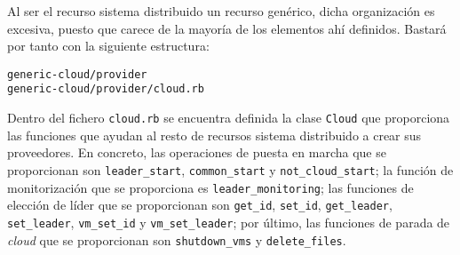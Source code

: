 Al ser el recurso sistema distribuido un recurso genérico, dicha organización es excesiva, puesto que carece de la mayoría de los elementos ahí definidos. Bastará por tanto con la siguiente estructura:

\begin{lstlisting}
generic-cloud/provider
generic-cloud/provider/cloud.rb
\end{lstlisting}

Dentro del fichero \texttt{cloud.rb} se encuentra definida la clase \texttt{Cloud} que proporciona las funciones que ayudan al resto de recursos sistema distribuido a crear sus proveedores. En concreto, las operaciones de puesta en marcha que se proporcionan son \texttt{leader\_start}, \texttt{common\_start} y \texttt{not\_cloud\_start}; la función de monitorización que se proporciona es \texttt{leader\_monitoring}; las funciones de elección de líder que se proporcionan son \texttt{get\_id}, \texttt{set\_id}, \texttt{get\_leader}, \texttt{set\_leader}, \texttt{vm\_set\_id} y \texttt{vm\_set\_leader}; por último, las funciones de parada de \emph{cloud} que se proporcionan son \texttt{shutdown\_vms} y \texttt{delete\_files}.
